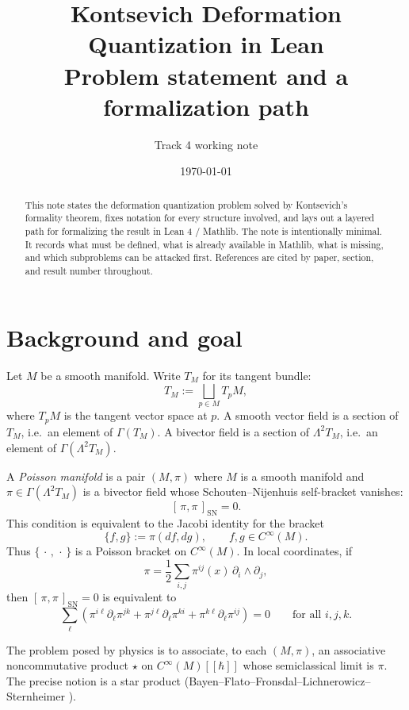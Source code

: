 \documentclass[11pt,a4paper]{article}
\title{Kontsevich Deformation Quantization in Lean\\
{\large Problem statement and a formalization path}}
\author{Track 4 working note}
\date{\today}
\theoremstyle{definition}
\newcommand{\Cinfty}{C^{\infty}}
\newcommand{\Sch}[2]{[\,#1,#2\,]_{\mathrm{SN}}}
\newcommand{\defi}[1]{\emph{#1}}
\begin{document}
\maketitle

\begin{abstract}
This note states the deformation quantization problem solved by
Kontsevich's formality theorem, fixes notation for every structure
involved, and lays out a layered path for formalizing the result in
Lean 4 / Mathlib. The note is intentionally minimal. It records what
must be defined, what is already available in Mathlib, what is missing,
and which subproblems can be attacked first. References are cited by
paper, section, and result number throughout.
\end{abstract}




\section{Background and goal}\label{sec:background}

Let $M$ be a smooth manifold. Write $T_M$ for its tangent bundle:
\[
T_M := \bigsqcup_{p \in M} T_pM,
\]
where $T_pM$ is the tangent vector space at $p$. A smooth vector field
is a section of $T_M$, i.e.\ an element of $\Gamma(T_M)$. A bivector field is a section of $\Lambda^2 T_M$, i.e.\ an element of
$\Gamma(\Lambda^2 T_M)$.

A \defi{Poisson manifold} is a pair $(M,\pi)$ where $M$ is a smooth
manifold and $\pi \in \Gamma(\Lambda^2 T_M)$ is a bivector field whose
Schouten--Nijenhuis self-bracket vanishes:
\[
\Sch{\pi}{\pi}=0.
\]
This condition is equivalent to the Jacobi identity for the bracket
\[
\{f,g\} := \pi(df, dg), \qquad f,g \in \Cinfty(M).
\]
Thus $\{\,\cdot\,,\,\cdot\,\}$ is a Poisson bracket on $\Cinfty(M)$.
In local coordinates, if
\[
\pi=\frac12\sum_{i,j}\pi^{ij}(x)\,\partial_i\wedge\partial_j,
\]
then $\Sch{\pi}{\pi}=0$ is equivalent to
\[
\sum_{\ell}
\left(
\pi^{i\ell}\partial_\ell\pi^{jk}
+ \pi^{j\ell}\partial_\ell\pi^{ki}
+ \pi^{k\ell}\partial_\ell\pi^{ij}
\right)=0
\qquad \text{for all } i,j,k.
\]

The problem posed by physics is to associate, to each
$(M,\pi)$, an associative noncommutative product $\star$ on
$\Cinfty(M)[[\hbar]]$ whose semiclassical limit is $\pi$. The precise
notion is a star product (Bayen--Flato--Fronsdal--Lichnerowicz--Sternheimer
\cite{BFFLS}).
\end{document}
